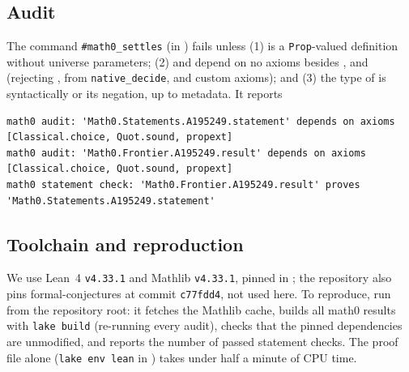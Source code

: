 \documentclass[11pt]{amsart}
\theoremstyle{plain}
\theoremstyle{definition}
\begin{document}
\subsection*{Audit}
The command \texttt{\#math0\_settles} (in ) fails unless (1)  is a \texttt{Prop}-valued definition without universe parameters; (2)  and  depend on no axioms besides ,  and  (rejecting ,  from \texttt{native\_decide}, and custom axioms); and (3) the type of  is syntactically  or its negation, up to metadata. It reports
\begin{lstlisting}[basicstyle=\ttfamily\scriptsize]
math0 audit: 'Math0.Statements.A195249.statement' depends on axioms [Classical.choice, Quot.sound, propext]
math0 audit: 'Math0.Frontier.A195249.result' depends on axioms [Classical.choice, Quot.sound, propext]
math0 statement check: 'Math0.Frontier.A195249.result' proves 'Math0.Statements.A195249.statement'
\end{lstlisting}

\subsection*{Toolchain and reproduction}
We use Lean~4 \cite{Lean4} \texttt{v4.33.1} and Mathlib \cite{Mathlib} \texttt{v4.33.1}, pinned in ; the repository also pins formal-conjectures \cite{FC} at commit \texttt{c77fdd4}, not used here.
To reproduce, run  from the repository root: it fetches the Mathlib cache, builds all math0 results with \texttt{lake build} (re-running every audit), checks that the pinned dependencies are unmodified, and reports the number of passed statement checks. The proof file alone (\texttt{lake env lean} in ) takes under half a minute of CPU time.
\end{document}
